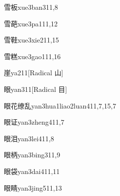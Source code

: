 \begin{verbete}{雪板}{xue3ban3}{11,8}
\end{verbete}

\begin{verbete}{雪葩}{xue3pa1}{11,12}
\end{verbete}

\begin{verbete}{雪鞋}{xue3xie2}{11,15}
\end{verbete}

\begin{verbete}{雪糕}{xue3gao1}{11,16}
\end{verbete}

\begin{verbete}{崖}{ya2}{11}[Radical 山]
\end{verbete}

\begin{verbete}{眼}{yan3}{11}[Radical 目]
\end{verbete}

\begin{verbete}{眼花缭乱}{yan3hua1liao2luan4}{11,7,15,7}
\end{verbete}

\begin{verbete}{眼证}{yan3zheng4}{11,7}
\end{verbete}

\begin{verbete}{眼泪}{yan3lei4}{11,8}
\end{verbete}

\begin{verbete}{眼柄}{yan3bing3}{11,9}
\end{verbete}

\begin{verbete}{眼袋}{yan3dai4}{11,11}
\end{verbete}

\begin{verbete}{眼睛}{yan3jing5}{11,13}
\end{verbete}

